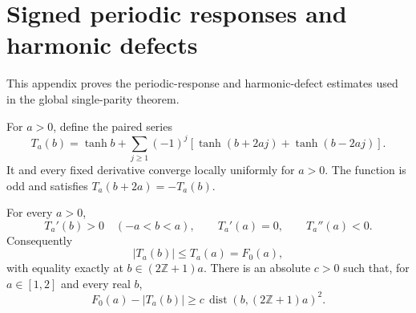 \section{Signed periodic responses and harmonic defects}
\label{app:periodic}

This appendix proves the periodic-response and harmonic-defect
estimates used in the global single-parity theorem.

For $a>0$, define the paired series
\begin{equation}\label{eq:periodic-response}
 T_a(b)=\tanh b+\sum_{j\ge1}(-1)^j
       [\tanh(b+2aj)+\tanh(b-2aj)].
\end{equation}
It and every fixed derivative converge locally uniformly for $a>0$.
The function is odd and satisfies $T_a(b+2a)=-T_a(b)$.

\begin{theorem}
\label{thm:periodic-max}
For every $a>0$,
\[
 T_a'(b)>0\quad(-a<b<a),\qquad T_a'(a)=0,\qquad T_a''(a)<0.
\]
Consequently
\[
 |T_a(b)|\le T_a(a)=F_0(a),
\]
with equality exactly at $b\in(2\mathbb Z+1)a$. There is an absolute
$c>0$ such that, for $a\in[1,2]$ and every real $b$,
\begin{equation}\label{eq:periodic-quadratic}
 F_0(a)-|T_a(b)|\ge
 c\,\operatorname{dist}(b,(2\mathbb Z+1)a)^2.
\end{equation}
\end{theorem}
